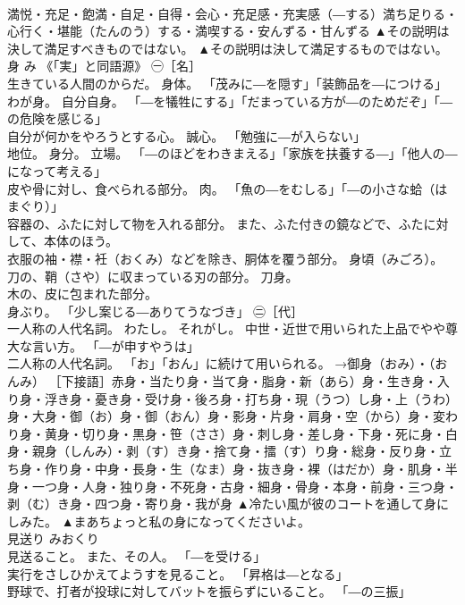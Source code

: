 \documentclass[8pt]{extreport}
\begin{document}
\begin{CJK}{UTF8}{min}
\\	満悦・充足・飽満・自足・自得・会心・充足感・充実感（―する）満ち足りる・心行く・堪能（たんのう）する・満喫する・安んずる・甘んずる	▲その説明は決して満足すべきものではない。 ▲その説明は決して満足するものではない。
\\	身	み	《「実」と同語源》 ㊀［名］ 
\\	生きている人間のからだ。 身体。 「茂みに―を隠す」「装飾品を―につける」 
\\	わが身。 自分自身。 「―を犠牲にする」「だまっている方が―のためだぞ」「―の危険を感じる」 
\\	自分が何かをやろうとする心。 誠心。 「勉強に―が入らない」 
\\	地位。 身分。 立場。 「―のほどをわきまえる」「家族を扶養する―」「他人の―になって考える」 
\\	皮や骨に対し、食べられる部分。 肉。 「魚の―をむしる」「―の小さな蛤（はまぐり）」 
\\	容器の、ふたに対して物を入れる部分。 また、ふた付きの鏡などで、ふたに対して、本体のほう。 
\\	衣服の袖・襟・衽（おくみ）などを除き、胴体を覆う部分。 身頃（みごろ）。 
\\	刀の、鞘（さや）に収まっている刃の部分。 刀身。 
\\	木の、皮に包まれた部分。 
\\	身ぶり。 「少し案じる―ありてうなづき」 ㊁［代］ 
\\	一人称の人代名詞。 わたし。 それがし。 中世・近世で用いられた上品でやや尊大な言い方。 「―が申すやうは」 
\\	二人称の人代名詞。 「お」「おん」に続けて用いられる。 →御身（おみ）・（おんみ） ［下接語］赤身・当たり身・当て身・脂身・新（あら）身・生き身・入り身・浮き身・憂き身・受け身・後ろ身・打ち身・現（うつ）し身・上（うわ）身・大身・御（お）身・御（おん）身・影身・片身・肩身・空（から）身・変わり身・黄身・切り身・黒身・笹（ささ）身・刺し身・差し身・下身・死に身・白身・親身（しんみ）・剥（す）き身・捨て身・擂（す）り身・総身・反り身・立ち身・作り身・中身・長身・生（なま）身・抜き身・裸（はだか）身・肌身・半身・一つ身・人身・独り身・不死身・古身・細身・骨身・本身・前身・三つ身・剥（む）き身・四つ身・寄り身・我が身	▲冷たい風が彼のコートを通して身にしみた。 ▲まあちょっと私の身になってくださいよ。
\\	見送り	みおくり	
\\	見送ること。 また、その人。 「―を受ける」 
\\	実行をさしひかえてようすを見ること。 「昇格は―となる」 
\\	野球で、打者が投球に対してバットを振らずにいること。 「―の三振」 

\end{CJK}
\end{document}
